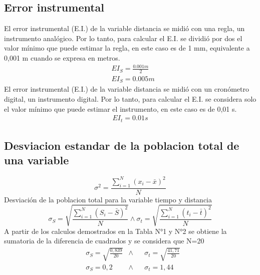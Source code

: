 \documentclass[runningheads]{llncs}
\begin{document}
\subsection{Error instrumental}
El error instrumental (E.I.) de la variable distancia se midió con una regla, un instrumento analógico. Por lo tanto, para calcular el E.I. se dividió por dos el valor mínimo que puede estimar la regla, en este caso es de 1 mm, equivalente a 0,001 m cuando se expresa en metros.
    \begin{align*}
        & EI_{S} =\frac{0.001 m}{2} \\
        & EI_{S} = 0.005 m \tag{A}
    \end{align*}
    El error instrumental (E.I.) de la variable distancia se midió con un cronómetro digital, un instrumento digital. Por lo tanto, para calcular el E.I. se considera solo el valor mínimo que puede estimar el instrumento, en este caso es de 0,01 s.    
    \begin{align*}
        EI_{t} = 0.01 s \tag{B}
    \end{align*}
\subsection{Desviacion estandar de la poblacion total de una variable}
    \begin{equation}
        \sigma^{2}={\frac{{\displaystyle \sum_{i=1}^{N}\left(x_{i}-\bar{x}\right)^{2}}}{N}}
    \end{equation}
    Desviación de la poblacion total para la variable tiempo y distancia
    \begin{equation}
        \sigma_{S}=\sqrt{{\frac{{\displaystyle \sum_{i=1}^{N}\left(S_{i}-\bar{S}\right)^{2}}}{N}}}
        \wedge 
        \sigma_{t}=\sqrt{{\frac{{\displaystyle \sum_{i=1}^{N}\left(t_{i}-\bar{t}\right)^{2}}}{N}}}
    \end{equation}
    A partir de los calculos demostrados en la Tabla N°1 y N°2 se obtiene la sumatoria de la diferencia de cuadrados y se considera que N=20
    \begin{align*}
        &\sigma_{S}=\sqrt{{\frac{0,839}{20}}}
        &\wedge&
        &\sigma_{t}=\sqrt{{\frac{41,71}{20}}}\\
        &\sigma_{S}=0,2
        &\wedge&
        &\sigma_{t}=1,44 \tag{C}
    \end{align*}
\end{document}
